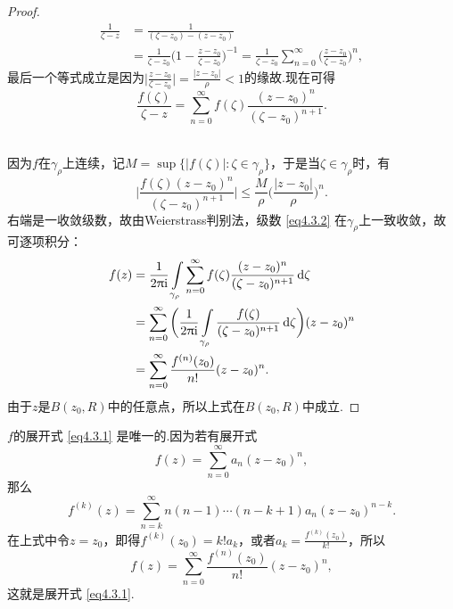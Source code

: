 \begin{proof}
\noindent\begin{minipage}{0.7\textwidth}
  \begin{align*}
    \frac1{\zeta-z}&=\frac1{(\zeta-z_0)-(z-z_0)}\\
    & = \frac1{\zeta-z_0} \bigg(1-\frac{z-z_0}{\zeta-z_0} \bigg)^{-1}
    = \frac1{\zeta-z_0} \sum_{n=0}^\infty\bigg(\frac{z-z_0}{\zeta-z_0}\bigg)^n,
  \end{align*}
  最后一个等式成立是因为$\bigg|\frac{z-z_0}{\zeta-z_0}\bigg|=\frac{|z-z_0|}\rho<1$的缘故.现在可得
  \begin{equation}\label{eq4.3.2}
    \frac{f(\zeta)}{\zeta-z} = \sum_{n=0}^\infty f(\zeta)\frac{(z-z_0)^n}{(\zeta-z_0)^{n+1}}.
  \end{equation}
\end{minipage}
\begin{minipage}{0.3\textwidth}
  \centering
\end{minipage}\\[1mm]
  因为$f$在$\gamma_\rho$上连续，记$M=\sup\{|f(\zeta)|:\zeta\in\gamma_\rho\}$，于是当$\zeta\in\gamma_\rho$时，有
  \[
    \bigg|\frac{f(\zeta)(z-z_0)^n}{(\zeta-z_0)^{n+1}}\bigg|\le\frac M\rho\bigg(
    \frac{|z-z_0|}\rho\bigg)^n.
  \]
  右端是一收敛级数，故由Weierstrass判别法，级数 \eqref{eq4.3.2} 在$\gamma_\rho$上一致收敛，故可逐项积分：
  \begin{align*}
    f(z) & = \frac1{2\uppi\mathrm i} \int\limits_{\gamma_\rho} \sum_{n=0}^\infty f(\zeta)\frac{(z-z_0)^n}{(\zeta-z_0)^{n+1}} \mathop{}\!\mathrm{d} \zeta\\
    & = \sum_{n=0}^\infty\bigg(\frac1{2\uppi\mathrm i} \int\limits_{\gamma_\rho}
    \frac{f(\zeta)}{(\zeta-z_0)^{n+1}}\mathop{}\!\mathrm{d} \zeta\bigg)(z-z_0)^n\\
    & = \sum_{n=0}^\infty \frac{f^{(n)}(z_0)}{n!}(z-z_0)^n.
  \end{align*}
  由于$z$是$B(z_0,R)$中的任意点，所以上式在$B(z_0,R)$中成立.
\end{proof}

$f$的展开式 \eqref{eq4.3.1} 是唯一的.因为若有展开式
\[
  f(z) = \sum_{n=0}^\infty a_n(z-z_0)^n,
\]
那么
\[
  f^{(k)}(z) = \sum_{n=k}^\infty n(n-1)\cdots(n-k+1)a_n(z-z_0)^{n-k}.
\]
在上式中令$z=z_0$，即得$f^{(k)}(z_0)=k!a_k$，或者$a_k=\frac{f^{(k)}(z_0)}{k!}$，所以
\begin{equation*}
  f(z) = \sum_{n=0}^\infty \frac{f^{(n)}(z_0)}{n!}(z-z_0)^n,
\end{equation*}
这就是展开式 \eqref{eq4.3.1}.

